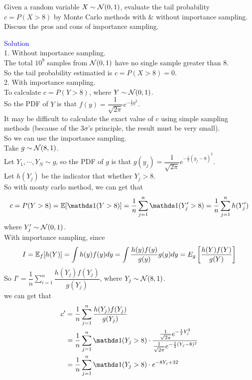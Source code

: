 \begin{homeworkProblem}

Given a random variable $X \sim \mathcal{N}(0,1)$, evaluate the tail probability $c=P(X>8)$ by Monte Carlo methods with \& without importance sampling. Discuss the pros and cons of importance sampling.

\textcolor{blue}{Solution} \\

1. Without importance sampling. \\
The total $10^9$ samples from $\mathcal{N}(0,1)$ have no single sample greater than 8. \\
So the tail probability estimatied is $c=P(X>8)=0$. \\

2. With importance sampling. \\
To calculate $c=P(Y>8)$, where $Y\sim \mathcal{N}(0,1)$. \\
So the PDF of $Y$ is that $f(y)=\dfrac{1}{\sqrt{2\pi}}e^{-\frac{1}{2}y^2}$. \\
It may be difficult to calculate the exact value of $c$ using simple sampling methods (because of the 3$\sigma$'s principle, the result must be very small). \\
So we can use the importance sampling. \\
Take $g\sim \mathcal{N}(8,1)$. \\
Let $Y_1,\cdots,Y_N\sim g$, so the PDF of $g$ is that $g(y_j)=\dfrac{1}{\sqrt{2\pi}}e^{-\frac{1}{2}(y_j-8)^2}$. \\
Let $h(Y_j)$ be the indicator that whether $Y_j>8$. \\

So with monty carlo method, we can get that \\
$$c=P(Y>8)=\E[\I(Y>8)]=\dfrac{1}{n}\sum_{j=1}^n\I(Y_j'>8)=\dfrac{1}{n}\sum_{j=1}^nh(Y_j')$$
where $Y_j'\sim \mathcal{N}(0,1)$.\\

With importance sampling, since
$$I=\mathbb{E}_f[h(Y)]=\int h(y)f(y)dy=\int\dfrac{h(y)f(y)}{g(y)}g(y)dy=E_g\left[\dfrac{h(Y)f(Y)}{g(Y)}\right]$$
So $I'=\dfrac{1}{n}\sum\limits_{i=1}^n\dfrac{h(Y_j)f(Y_j)}{g(Y_j)}$, where $Y_j\sim \mathcal{N}(8,1)$.\\
we can get that
\begin{align*}
c' &= \dfrac{1}{n}\sum_{j=1}^n\dfrac{h(Y_j)f(Y_j)}{g(Y_j)} \\
&= \dfrac{1}{n}\sum_{j=1}^n\I(Y_j>8)\cdot \dfrac{\frac{1}{\sqrt{2\pi}}e^{-\frac{1}{2}Y_j^2}}{\frac{1}{\sqrt{2\pi}}e^{-\frac{1}{2}(Y_j-8)^2}} \\
&= \dfrac{1}{n}\sum_{j=1}^n\I(Y_j>8)\cdot e^{-8Y_j+32}
\end{align*}


\end{homeworkProblem}
